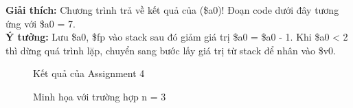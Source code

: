 \documentclass[a4paper,12pt]{article}
\begin{document}
\clearpage
\noindent
\textbf{Giải thích:} Chương trình trả về kết quả của (\$a0)! Đoạn code dưới đây tương ứng với \$a0 = 7. \\
\textbf{Ý tưởng:} Lưu \$a0, \$fp vào stack sau đó giảm giá trị \$a0 = \$a0 - 1. Khi \$a0 < 2 thì dừng quá trình lặp, chuyển sang bước lấy giá trị từ stack để nhân vào \$v0.
\begin{figure}[!h]
	\centerline{}
	\caption{Kết quả của Assignment 4}
	\label{fig:ass4_kq}
\end{figure}
\begin{figure}[!h]
	\centerline{}
	\caption{Minh họa với trường hợp n = 3}
	\label{fig:ass4_kqq}
\end{figure}
\end{document}
